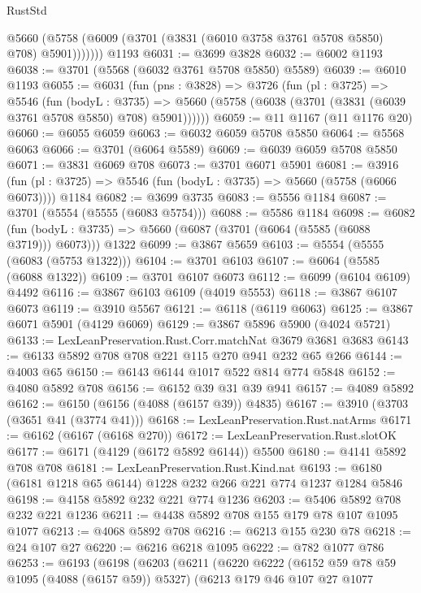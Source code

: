 \begin{lexlean}{RustStd}
\begin{coremodule}
          @5660 (@5758 (@6009 (@3701 (@3831 (@6010 @3758 @3761 @5708 @5850) @708) @5901)))))))
    @1193
@6031 := @3699 @3828
@6032 := @6002 @1193
@6038 := @3701 (@5568 (@6032 @3761 @5708 @5850) @5589)
@6039 := @6010 @1193
@6055 := @6031
    (fun (pns : @3828) =>
    @3726
      (fun (pl : @3725) =>
      @5546
        (fun (bodyL : @3735) =>
        @5660 (@5758 (@6038 (@3701 (@3831 (@6039 @3761 @5708 @5850) @708) @5901))))))
@6059 := @11 @1167 (@11 @1176 @20)
@6060 := @6055 @6059
@6063 := @6032 @6059 @5708 @5850
@6064 := @5568 @6063
@6066 := @3701 (@6064 @5589)
@6069 := @6039 @6059 @5708 @5850
@6071 := @3831 @6069 @708
@6073 := @3701 @6071 @5901
@6081 := @3916
    (fun (pl : @3725) => @5546 (fun (bodyL : @3735) => @5660 (@5758 (@6066 @6073))))
    @1184
@6082 := @3699 @3735
@6083 := @5556 @1184
@6087 := @3701 (@5554 (@5555 (@6083 @5754)))
@6088 := @5586 @1184
@6098 := @6082
    (fun (bodyL : @3735) => @5660 (@6087 (@3701 (@6064 (@5585 (@6088 @3719))) @6073)))
    @1322
@6099 := @3867 @5659
@6103 := @5554 (@5555 (@6083 (@5753 @1322)))
@6104 := @3701 @6103
@6107 := @6064 (@5585 (@6088 @1322))
@6109 := @3701 @6107 @6073
@6112 := @6099 (@6104 @6109) @4492
@6116 := @3867 @6103 @6109 (@4019 @5553)
@6118 := @3867 @6107 @6073
@6119 := @3910 @5567
@6121 := @6118 (@6119 @6063)
@6125 := @3867 @6071 @5901 (@4129 @6069)
@6129 := @3867 @5896 @5900 (@4024 @5721)
@6133 := LexLeanPreservation.Rust.Corr.matchNat @3679 @3681 @3683
@6143 := @6133 @5892 @708 @708 @221 @115 @270 @941 @232 @65 @266
@6144 := @4003 @65
@6150 := @6143 @6144 @1017 @522 @814 @774 @5848
@6152 := @4080 @5892 @708
@6156 := @6152 @39 @31 @39 @941
@6157 := @4089 @5892
@6162 := @6150 (@6156 (@4088 (@6157 @39)) @4835)
@6167 := @3910 (@3703 (@3651 @41 (@3774 @41)))
@6168 := LexLeanPreservation.Rust.natArms
@6171 := @6162 (@6167 (@6168 @270))
@6172 := LexLeanPreservation.Rust.slotOK
@6177 := @6171 (@4129 (@6172 @5892 @6144)) @5500
@6180 := @4141 @5892 @708 @708
@6181 := LexLeanPreservation.Rust.Kind.nat
@6193 := @6180 (@6181 @1218 @65 @6144) @1228 @232 @266 @221 @774 @1237 @1284 @5846
@6198 := @4158 @5892 @232 @221 @774 @1236
@6203 := @5406 @5892 @708 @232 @221 @1236
@6211 := @4438 @5892 @708 @155 @179 @78 @107 @1095 @1077
@6213 := @4068 @5892 @708
@6216 := @6213 @155 @230 @78
@6218 := @24 @107 @27
@6220 := @6216 @6218 @1095
@6222 := @782 @1077 @786
@6253 := @6193
    (@6198
      (@6203
        (@6211
          (@6220
            @6222
            (@6152 @59 @78 @59 @1095 (@4088 (@6157 @59)) @5327)
            (@6213
              @179
              @46
              @107
              @27
              @1077

\end{coremodule}
\end{lexlean}
